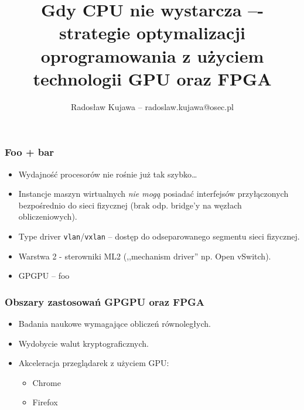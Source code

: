 \documentclass[dvipsnames,table]{beamer}
\title{Gdy CPU nie wystarcza –- strategie optymalizacji oprogramowania z użyciem technologii GPU oraz FPGA}
\author{Radosław Kujawa -- radoslaw.kujawa@osec.pl}
\institute{OSEC}
\begin{document}
\begin{frame}
	\titlepage
\end{frame}

\begin{frame}
	\frametitle{Foo + bar}
\begin{itemize}
	\item Wydajność procesorów nie rośnie już tak szybko\dots
	\item Instancje maszyn wirtualnych {\em nie mogą} posiadać interfejsów przyłączonych bezpośrednio do sieci fizycznej (brak odp. bridge'y na węzłach obliczeniowych).
	\item Type driver {\tt vlan}/{\tt vxlan} -- dostęp do odseparowanego segmentu sieci fizycznej.
	\item Warstwa 2 - sterowniki ML2 (,,mechanism driver'' np. Open vSwitch).
	\item GPGPU -- foo
\end{itemize}
\end{frame}

\begin{frame}
	\frametitle{Obszary zastosowań GPGPU oraz FPGA} 
\begin{itemize}
	\item Badania naukowe wymagające obliczeń równoległych.
	\item Wydobycie walut kryptograficznych.
	\item Akceleracja przeglądarek z użyciem GPU:
	\begin{itemize}
		\item Chrome
		\item Firefox
	\end{itemize}
\end{itemize}
\end{frame}
\end{document}
